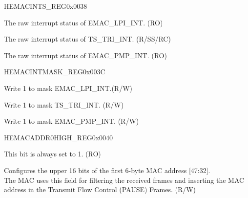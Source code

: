\begin{register}{H}{EMACINTS\_REG}{0x0038}\label{regdesc:EMACINTSREG}
%
%
%
%
%
%
\regnewline%
\begin{regdesc}\begin{reglist}
\item [LPIINTS] The raw interrupt status of EMAC\_LPI\_INT. (RO)
\item [TINTS] The raw interrupt status of TS\_TRI\_INT. (R/SS/RC)
\item [PMTINTS] The raw interrupt status of EMAC\_PMP\_INT. (RO)
\end{reglist}\end{regdesc}
\end{register}


\begin{register}{H}{EMACINTMASK\_REG}{0x003C}\label{regdesc:EMACINTMASKREG}
%
%
%
%
%
%
\regnewline%
\begin{regdesc}\begin{reglist}
\item [LPIINTMASK] Write 1 to mask EMAC\_LPI\_INT.(R/W)
\item [TSINTMASK] Write 1 to mask TS\_TRI\_INT. (R/W)
\item [PMTINTMASK] Write 1 to mask EMAC\_PMP\_INT. (R/W)
\end{reglist}\end{regdesc}
\end{register}


\begin{register}{H}{EMACADDR0HIGH\_REG}{0x0040}\label{regdesc:EMACADDR0HIGHREG}
%
%
%
\regnewline%
\begin{regdesc}\begin{reglist}
\item [ADDRESS\_ENABLE0] This bit is always set to 1. (RO)
\item [MAC\_ADDRESS0\_HI] Configures the upper 16 bits of the first 6-byte MAC address [47:32].\\The MAC uses this field for filtering the received frames and inserting the MAC address in the Transmit Flow Control (PAUSE) Frames. (R/W)
\end{reglist}\end{regdesc}
\end{register}


